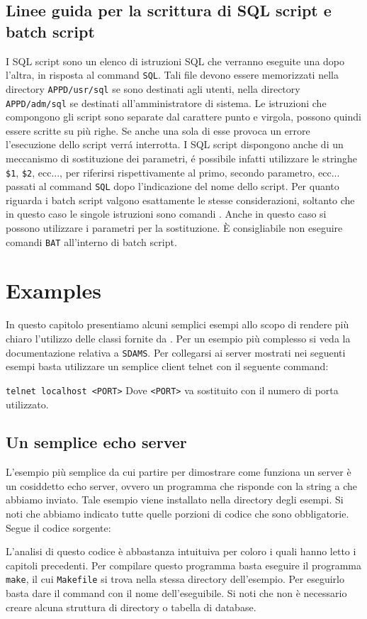 \section{Linee guida per la scrittura di SQL script e batch script}
I SQL script sono un elenco di istruzioni SQL che verranno eseguite
una dopo l'altra, in risposta al command \verb|SQL|. Tali file devono
essere memorizzati nella directory \verb|APPD/usr/sql| se sono
destinati agli utenti, nella directory \verb|APPD/adm/sql| se
destinati all'amministratore di sistema. Le istruzioni che compongono
gli script sono separate dal carattere punto e virgola, possono quindi
essere scritte su pi\`u righe. Se anche una sola di esse provoca un
errore l'esecuzione dello script verr\'a interrotta. I SQL script
dispongono anche di un meccanismo di sostituzione dei parametri, \'e
possibile infatti utilizzare le stringhe \verb|$1|, \verb|$2|, ecc...,
per riferirsi rispettivamente al primo, secondo parametro, ecc...
passati al command \verb|SQL| dopo l'indicazione del nome dello
script. Per quanto riguarda i batch script valgono esattamente le
stesse considerazioni, soltanto che in questo caso le singole
istruzioni sono comandi \mcs. Anche in questo caso si possono
utilizzare i parametri per la sostituzione. \`E consigliabile non
eseguire comandi \verb|BAT| all'interno di batch script.






\chapter{Examples}
In questo capitolo presentiamo alcuni semplici esempi allo scopo di
rendere pi\`u chiaro l'utilizzo delle classi fornite da
\mcs. Per un esempio pi\`u complesso si veda la documentazione
relativa a \verb|SDAMS|. Per collegarsi ai server mostrati nei
seguenti esempi basta utilizzare un semplice client telnet con il
seguente command:

\bigskip
\verb|telnet localhost <PORT>|
\bigskip\newline
%
Dove \verb|<PORT>| va sostituito con il numero di porta utilizzato.


\section{Un semplice echo server}
L'esempio pi\`u semplice da cui partire per dimostrare come funziona
un server \`e un cosiddetto echo server, ovvero un programma che
risponde con la string a che abbiamo inviato. Tale esempio viene
installato nella directory degli esempi. Si noti che abbiamo indicato
tutte quelle porzioni di codice che sono obbligatorie. Segue il codice
sorgente: \newline
%
\footnotesize

\normalsize
%
L'analisi di questo codice \`e abbastanza intuituiva per coloro i
quali hanno letto i capitoli precedenti. Per compilare questo
programma basta eseguire il programma \verb|make|, il cui
\verb|Makefile| si trova nella stessa directory dell'esempio. Per
eseguirlo basta dare il command con il nome dell'eseguibile. Si noti
che non \`e necessario creare alcuna struttura di directory o tabella
di database.

